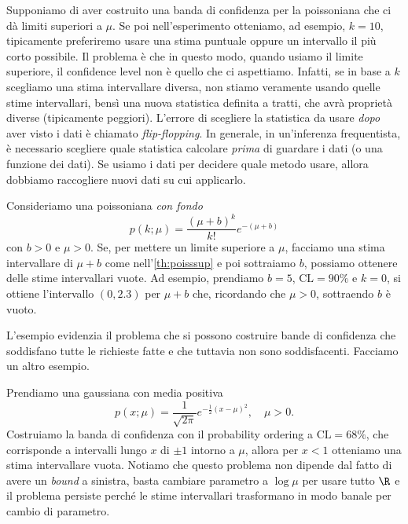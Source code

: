 

Supponiamo di aver costruito una banda di confidenza per la poissoniana che ci dà limiti superiori a $\mu$.
Se poi nell'esperimento otteniamo, ad esempio, $k=10$,
tipicamente preferiremo usare una stima puntuale oppure un intervallo il più corto possibile.
Il problema è che in questo modo, quando usiamo il limite superiore,
il confidence level non è quello che ci aspettiamo.
Infatti, se in base a $k$ scegliamo una stima intervallare diversa,
non stiamo veramente usando quelle stime intervallari,
bensì una nuova statistica definita a tratti,
che avrà proprietà diverse (tipicamente peggiori).
L'errore di scegliere la statistica da usare \emph{dopo}
aver visto i dati è chiamato \emph{flip-flopping}.
In generale, in un'inferenza frequentista,
è necessario scegliere quale statistica calcolare \emph{prima}
di guardare i dati (o una funzione dei dati).
Se usiamo i dati per decidere quale metodo usare,
allora dobbiamo raccogliere nuovi dati su cui applicarlo.

\begin{example}
	Consideriamo una poissoniana \emph{con fondo}
	\begin{equation*}
		p(k;\mu)
		= \frac{(\mu+b)^k}{k!}e^{-(\mu+b)}
	\end{equation*}
	con $b>0$ e $\mu>0$.
	Se, per mettere un limite superiore a $\mu$,
	facciamo una stima intervallare di $\mu+b$ come nell'\autoref{th:poisssup} e poi sottraiamo $b$,
	possiamo ottenere delle stime intervallari vuote.
	Ad esempio, prendiamo $b=5$, $\mathrm{CL}=\SI{90}\%$ e $k=0$,
	si ottiene l'intervallo $(0,2.3)$ per $\mu+b$ che,
	ricordando che $\mu>0$, sottraendo $b$ è vuoto.
\end{example}

L'esempio evidenzia il problema che si possono costruire bande di confidenza
che soddisfano tutte le richieste fatte e che tuttavia non sono soddisfacenti.
Facciamo un altro esempio.

\begin{example}
	Prendiamo una gaussiana con media positiva
	\begin{equation*}
		p(x;\mu)
		= \frac1{\sqrt{2\pi}} e^{-\frac12(x-\mu)^2}, \quad \mu>0.
	\end{equation*}
	Costruiamo la banda di confidenza con il probability ordering a $\mathrm{CL}=\SI{68}\%$,
	che corrisponde a intervalli lungo $x$ di $\pm1$ intorno a $\mu$,
	allora per $x<1$ otteniamo una stima intervallare vuota.
	Notiamo che questo problema non dipende dal fatto di avere un \emph{bound} a sinistra,
	basta cambiare parametro a $\log\mu$ per usare tutto $\R$ e il problema persiste perché
	le stime intervallari trasformano in modo banale per cambio di parametro.
\end{example}

